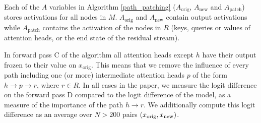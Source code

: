 Each of the $A$ variables in Algorithm \ref{path_patching} ($A_{\mathrm{orig}}$, $A_{\mathrm{new}}$ and $A_{\mathrm{patch}}$) stores activations for all nodes in $M$. $A_{\mathrm{orig}}$ and $A_{\mathrm{new}}$ contain output activations while $A_{\mathrm{patch}}$ contains the activation of the nodes in $R$ (keys, queries or values of attention heads, or the end state of the residual stream).

In forward pass C of the algorithm all attention heads except $h$ have their output frozen to their value on $x_{\text{orig}}$. This means that we remove the influence of every path including one (or more) intermediate attention heads $p$ of the form $h \to p \to r$, where $r \in R$. In all cases in the paper, we measure the logit difference on the forward pass D compared to the logit difference of the model, as a measure of the importance of the path $h \to r$. We additionally compute this logit difference as an average over $N>200$ pairs $(x_{\mathrm{orig}}, x_{\mathrm{new}})$.



